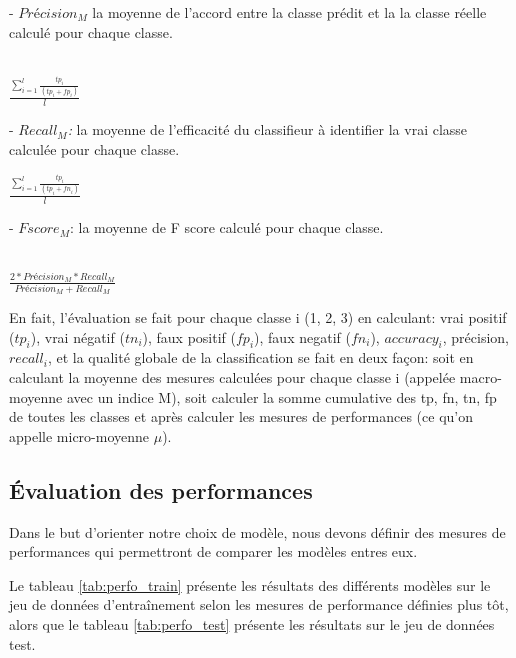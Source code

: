 - $Précision_{M}$ la moyenne de l'accord entre la classe prédit et la la classe réelle calculé pour chaque classe.\\\\
\begin{center}
	$\frac{\sum_{i=1}^{l} \frac{tp_i}{(tp_i + fp_i)}}{l}$
\end{center}

- \textit{$Recall_{M}$: } la moyenne de l'efficacité du classifieur à identifier la vrai classe calculée pour chaque classe.\\
\begin{center}
	$\frac{\sum_{i=1}^{l} \frac{tp_i}{(tp_i + fn_i)}}{l}$
\end{center}

- \textit{$Fscore_{M}$}: la moyenne de F score calculé pour chaque classe.\\\\
\begin{center}
	$\frac{2 * Précision_{M} * Recall_{M}}{Précision_{M} + Recall_{M}}$
\end{center}


En fait, l'évaluation se fait pour chaque classe i (1, 2, 3) en calculant:  vrai positif ($tp_i$), vrai négatif ($tn_i$), faux positif ($fp_i$), faux negatif ($fn_i$), \textit{$accuracy_i$}, précision, \textit{$recall_i$}, et la qualité globale de la classification se fait en deux façon: soit en calculant la moyenne des mesures calculées  pour chaque classe i (appelée macro-moyenne avec un indice M), soit calculer la somme cumulative  des tp, fn, tn, fp de toutes les classes et après calculer les mesures de performances (ce qu'on appelle micro-moyenne $\mu$).







\subsection{Évaluation des performances}
Dans le but d'orienter notre choix de modèle, nous devons définir des mesures de performances qui permettront de comparer les modèles entres eux.

Le tableau \ref{tab:perfo_train} présente les résultats des différents modèles sur le jeu de données d'entraînement selon les mesures de performance définies plus tôt, alors que le tableau \ref{tab:perfo_test} présente les résultats sur le jeu de données test.

